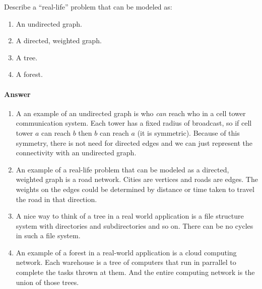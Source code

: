 \documentclass{article}
\begin{document}




\nextprob
{}

Describe a ``real-life'' problem that can be modeled as:

\begin{enumerate}
    \item An undirected graph.
    \item A directed, weighted graph.
    \item A tree.
    \item A forest.
\end{enumerate}

\paragraph{Answer}


\begin{enumerate}
    \item A an example of an undirected graph is who \textit{can} reach who in a cell tower communication system.
    Each tower has a fixed radius of broadcast, so if cell tower $a$ can reach $b$ then $b$ can reach $a$ (it is symmetric).
    Because of this symmetry, there is not need for directed edges and we can just represent the connectivity with an undirected graph.
    \item An example of a real-life problem that can be modeled as a directed, weighted graph is a road network.
    Cities are vertices and roads are edges.
    The weights on the edges could be determined by distance or time taken to travel the road in that direction.
    \item A nice way to think of a tree in a real world application is a file structure system with directories and subdirectories and so on.
    There can be no cycles in such a file system.
    \item An example of a forest in a real-world application is a cloud computing network.
    Each warehouse is a tree of computers that run in parrallel to complete the tasks thrown at them.
    And the entire computing network is the union of those trees.
\end{enumerate}

\end{document}
